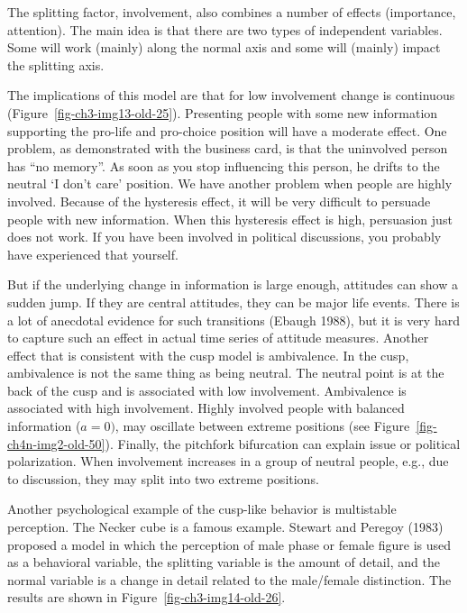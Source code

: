 \documentclass[
  a4paper,
  DIV=11,
  numbers=noendperiod]{scrreprt}
\begin{document}
The splitting factor, involvement, also combines a number of effects
(importance, attention). The main idea is that there are two types of
independent variables. Some will work (mainly) along the normal axis and
some will (mainly) impact the splitting axis.

The implications of this model are that for low involvement change is
continuous (Figure~\ref{fig-ch3-img13-old-25}). Presenting people with
some new information supporting the pro-life and pro-choice position
will have a moderate effect. One problem, as demonstrated with the
business card, is that the uninvolved person has ``no memory''. As soon
as you stop influencing this person, he drifts to the neutral `I don't
care' position. We have another problem when people are highly involved.
Because of the hysteresis effect, it will be very difficult to persuade
people with new information. When this hysteresis effect is high,
persuasion just does not work. If you have been involved in political
discussions, you probably have experienced that yourself.

But if the underlying change in information is large enough, attitudes
can show a sudden jump. If they are central attitudes, they can be major
life events. There is a lot of anecdotal evidence for such transitions
(Ebaugh 1988), but it is very hard to capture such an effect in actual
time series of attitude measures. Another effect that is consistent with
the cusp model is ambivalence. In the cusp, ambivalence is not the same
thing as being neutral. The neutral point is at the back of the cusp and
is associated with low involvement. Ambivalence is associated with high
involvement. Highly involved people with balanced information
(\(a = 0)\), may oscillate between extreme positions (see
Figure~\ref{fig-ch4n-img2-old-50}). Finally, the pitchfork bifurcation
can explain issue or political polarization. When involvement increases
in a group of neutral people, e.g., due to discussion, they may split
into two extreme positions.

Another psychological example of the cusp-like behavior is multistable
perception. The Necker cube is a famous example. Stewart and Peregoy
(1983) proposed a model in which the perception of male phase or female
figure is used as a behavioral variable, the splitting variable is the
amount of detail, and the normal variable is a change in detail related
to the male/female distinction. The results are shown in
Figure~\ref{fig-ch3-img14-old-26}.
\end{document}
